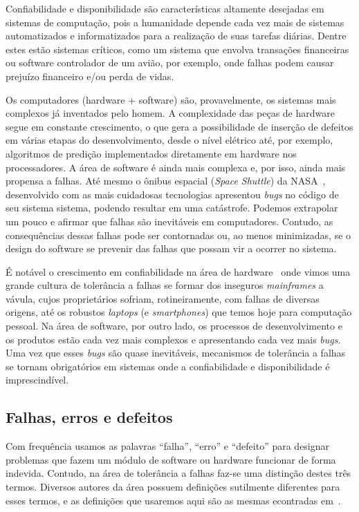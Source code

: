 Confiabilidade e disponibilidade são características altamente desejadas em sistemas de computação, pois a humanidade depende cada vez mais de sistemas automatizados e informatizados para a realização de suas tarefas diárias. Dentre estes estão sistemas críticos, como um sistema que envolva transações financeiras ou software controlador de um avião, por exemplo, onde falhas podem causar prejuízo financeiro e/ou perda de vidas.

Os computadores (hardware + software) são, provavelmente, os sistemas mais complexos já inventados pelo homem. A complexidade das peças de hardware segue em constante crescimento, o que gera a possibilidade de inserção de defeitos em várias etapas do desenvolvimento, desde o nível elétrico até, por exemplo, algoritmos de predição implementados diretamente em hardware nos processadores. A área de software é ainda mais complexa e, por isso, ainda mais propensa a falhas. Até mesmo o ônibus espacial (\emph{Space Shuttle}) da NASA~\cite{BonacheaOnline}, desenvolvido com as mais cuidadosas tecnologias apresentou \emph{bugs} no código de seu sistema sistema, podendo resultar em uma catástrofe. Podemos extrapolar um pouco e afirmar que falhas são inevitáveis em computadores. Contudo, as consequências dessas falhas pode ser contornadas ou, ao menos minimizadas, se o design do software se prevenir das falhas que possam vir a ocorrer no sistema.

É notável o crescimento em confiabilidade na área de hardware~\cite{Weber} onde vimos uma grande cultura de tolerância a falhas se formar dos inseguros \emph{mainframes} a vávula, cujos proprietários sofriam, rotineiramente, com falhas de diversas origens, até os robustos \emph{laptops} (e \emph{smartphones}) que temos hoje para computação pessoal. Na área de software, por outro lado, os processos de desenvolvimento e os produtos estão cada vez mais complexos e apresentando cada vez mais \emph{bugs}. Uma vez que esses \emph{bugs} são quase inevitáveis, mecanismos de tolerância a falhas se tornam obrigatórios em sistemas onde a confiabilidade e disponibilidade é imprescindível.

\subsection{Falhas, erros e defeitos} %
\label{sub:falhas_erros_e_defeitos}

Com frequência usamos as palavras ``falha'', ``erro'' e ``defeito'' para designar problemas que fazem um módulo de software ou hardware funcionar de forma indevida. Contudo, na área de tolerância a falhas faz-se uma distinção destes três termos. Diversos autores da área possuem definições sutilmente diferentes para esses termos, e as definições que usaremos aqui são as mesmas econtradas em~\cite{koren2007fault}.

